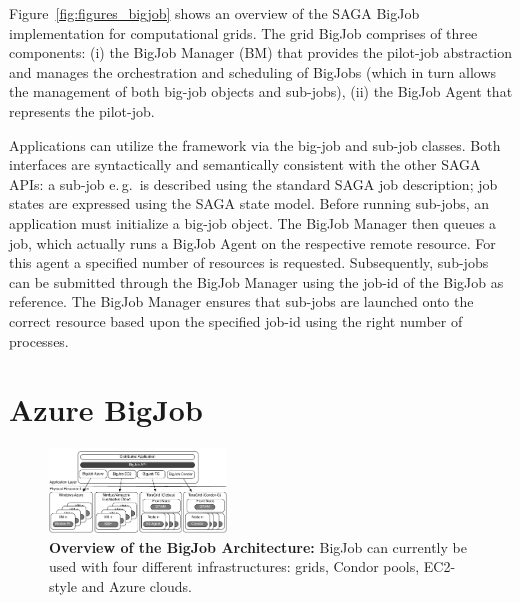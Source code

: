 \documentclass[conference,final]{IEEEtran}
\newcommand{\up}{\vspace*{-1em}}
\begin{document}
Figure~\ref{fig:figures_bigjob} shows an overview of the SAGA BigJob
implementation for computational grids. The grid BigJob comprises of
three components: (i) the BigJob Manager (BM) that provides the pilot-job
abstraction and manages the orchestration and scheduling of BigJobs
(which in turn allows the management of both big-job objects and
sub-jobs), (ii) the BigJob Agent that represents the pilot-job.

Applications can utilize the framework via the big-job and sub-job
classes. Both interfaces are syntactically and semantically consistent
with the other SAGA APIs: a sub-job e.\,g.\ is described using 
the standard SAGA job description; job states are expressed
using the SAGA state model. Before running sub-jobs, an application must initialize
a big-job object. The BigJob Manager then queues a job,
which actually runs a BigJob Agent on the respective remote
resource. For this agent a specified number of resources is
requested. Subsequently, sub-jobs can be submitted through the BigJob
Manager using the job-id of the BigJob as reference. The BigJob
Manager ensures that sub-jobs are launched onto the correct
resource based upon the specified job-id using the right number of
processes.




\up
\section{Azure BigJob}
\label{sec:bigjob-saga}
\up


\begin{figure}[t]
    \centering
        \includegraphics[width=0.42\textwidth]{figures/distributed_pilot_job}
        \caption{\textbf{Overview of the BigJob Architecture:} BigJob
          can currently be used with four different infrastructures:
          grids, Condor pools, EC2-style and Azure clouds.\up}
    \label{fig:figures_distributed_pilot_job}
\end{figure}
\end{document}
